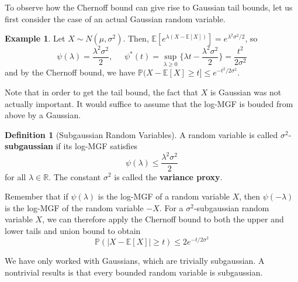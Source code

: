 \documentclass{article}
\theoremstyle{definition}
\newtheorem{example}{Example}[section]
\theoremstyle{remark}
\theoremstyle{definition}
\newtheorem{definition}{Definition}[section]
\begin{document}
  To observe how the Chernoff bound can give rise to Gaussian tail bounds, let us first consider the case of an actual Gaussian random variable. 

  \begin{example}
  Let $X \sim N(\mu, \sigma^2)$. Then, $\mathbb{E}[ e^{\lambda (X - \mathbb{E}[X])} ] = e^{\lambda^2 \sigma^2 / 2}$, so 
  \[\psi(\lambda) = \frac{\lambda^2 \sigma^2}{2}, \;\;\;\;\; \psi^* (t) = \sup_{\lambda \geq 0} \big\{ \lambda t - \frac{\lambda^2 \sigma^2}{2} \big\} = \frac{t^2}{2 \sigma^2}\]
  and by the Chernoff bound, we have $\mathbb{P}(X - \mathbb{E}[X] \geq t ] \leq e^{-t^2 / 2\sigma^2}$. 
  \end{example}

  Note that in order to get the tail bound, the fact that $X$ is Gaussian was not actually important. It would suffice to assume that the log-MGF is bouded from above by a Gaussian. 

  \begin{definition}[Subgaussian Random Variables]
  A random variable is called $\sigma^2$-\textbf{subgaussian} if its log-MGF satisfies 
  \[\psi(\lambda) \leq \frac{\lambda^2 \sigma^2}{2}\]
  for all $\lambda \in \mathbb{R}$. The constant $\sigma^2$ is called the \textbf{variance proxy}. 
  \end{definition}

  Remember that if $\psi(\lambda)$ is the log-MGF of a random variable $X$, then $\psi(-\lambda)$ is the log-MGF of the random variable $-X$. For a $\sigma^2$-subgaussian random variable $X$, we can therefore apply the Chernoff bound to both the upper and lower tails and union bound to obtain 
  \[\mathbb{P}(|X - \mathbb{E}[X]| \geq t ) \leq 2 e^{-t/2\sigma^2}\]

  We have only worked with Gaussians, which are trivially subgaussian. A nontrivial results is that every bounded random variable is subgaussian. 
\end{document}
